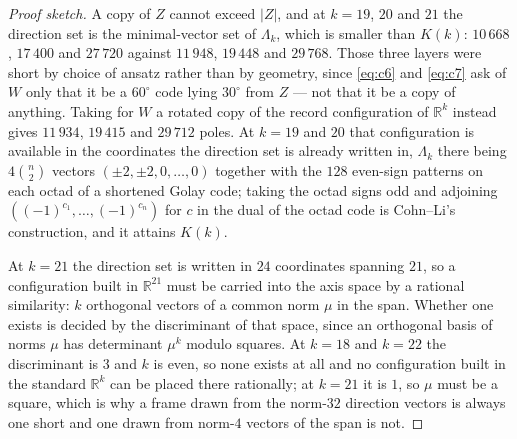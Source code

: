 \documentclass[11pt]{amsart}
\theoremstyle{remark}
\newcommand{\R}{\mathbb{R}}
\begin{document}
\begin{proof}[Proof sketch]
A copy of $Z$ cannot exceed $|Z|$, and at $k=19$, $20$ and $21$ the direction set is the
minimal-vector set of $\Lambda_k$, which is smaller than $K(k)$: $10\,668$, $17\,400$ and
$27\,720$ against $11\,948$, $19\,448$ and $29\,768$. Those three layers were short by
choice of ansatz rather than by geometry, since \eqref{eq:c6} and \eqref{eq:c7} ask of $W$
only that it be a $60^\circ$ code lying $30^\circ$ from $Z$ --- not that it be a copy of
anything. Taking for $W$ a rotated copy of the record configuration of $\R^k$ instead gives
$11\,934$, $19\,415$ and $29\,712$ poles. At $k=19$ and $20$ that configuration is available
in the coordinates the direction set is already written in, $\Lambda_k$ there being
$4\binom{n}{2}$ vectors $(\pm2,\pm2,0,\dots,0)$ together with the $128$ even-sign patterns
on each octad of a shortened Golay code; taking the octad signs odd and adjoining
$((-1)^{c_1},\dots,(-1)^{c_n})$ for $c$ in the dual of the octad code is Cohn--Li's
construction, and it attains $K(k)$.

At $k=21$ the direction set is written in $24$ coordinates spanning $21$, so a configuration
built in $\R^{21}$ must be carried into the axis space by a rational similarity: $k$
orthogonal vectors of a common norm $\mu$ in the span. Whether one exists is decided by the
discriminant of that space, since an orthogonal basis of norms $\mu$ has determinant $\mu^k$
modulo squares. At $k=18$ and $k=22$ the discriminant is $3$ and $k$ is even, so none exists
at all and no configuration built in the standard $\R^k$ can be placed there rationally; at
$k=21$ it is $1$, so $\mu$ must be a square, which is why a frame drawn from the norm-$32$
direction vectors is always one short and one drawn from norm-$4$ vectors of the span is not.


\end{proof}
\end{document}
